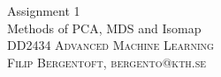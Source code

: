 \documentclass[11pt,oneside,a4paper]{article}
\date{}
\theoremstyle{definition}
\theoremstyle{remark}
\begin{document}
\renewcommand{\bibname}{References}
\hypersetup{citecolor=black}
\begin{titlepage}\centering
\vspace*{\fill}
\Huge Assignment 1\\
\vspace*{10mm}
\large Methods of PCA, MDS and Isomap \\
\vspace*{\fill}
\large \textsc{DD2434 Advanced Machine Learning} \\
\textsc{Filip Bergentoft, bergento@kth.se} \\
\end{titlepage}

\newpage














\end{document}

